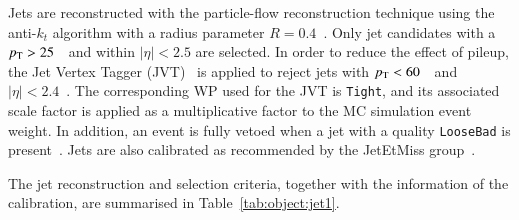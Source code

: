 %
Jets are reconstructed with the particle-flow reconstruction technique  using the  anti-$k_t$ algorithm with a radius parameter $R=0.4$~\cite{atlascollaboration2020jet}. Only jet candidates with a $p_{\text{T}} > 25$~\GeV~and within $|\eta|<2.5$ are selected.  In order to reduce the effect of pileup, the Jet Vertex Tagger (JVT)~\cite{twiki:JetVertexTaggerTool}  is applied to reject jets with $p_{\text{T}}<60$~\GeV~and  $|\eta|<2.4$~\cite{twiki:PileupJetRecommendations}. The corresponding WP used for the JVT is  \texttt{Tight}, and its associated scale factor is applied as a multiplicative factor to the MC simulation event weight.  In addition, an event is  fully vetoed when a jet with a quality  \texttt{LooseBad} is present~\cite{twiki:HowToCleanJets2017}. Jets are also calibrated as recommended by the JetEtMiss group~\cite{twiki:ApplyJetCalibrationR21}. 

 The jet reconstruction and selection criteria, together with the information of the calibration, are summarised in Table~\ref{tab:object:jet1}.


